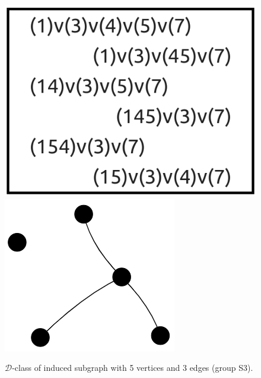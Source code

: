 \begin{appendices}
\begin{figure}[H]
\includegraphics[scale=0.09]{images/x9/x9_5v_3e_1.png}
\includegraphics[scale=0.1]{images/x9/x9_5v_3e_1_vis.png}
\caption{$\mathcal{D}$-class of induced subgraph with 5 vertices and 3 edges (group S3).}
\end{figure}


\end{appendices}
